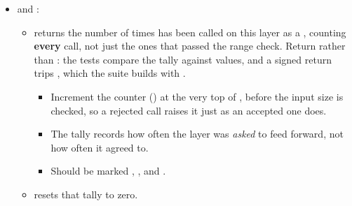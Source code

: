 \begin{itemize}
\begin{itemize}
\begin{itemize}
    \end{itemize}
    \item Returns nothing, and should be marked .
    \item \textbf{Not} part of . It exists on the stub alone.
    \item It's what lets a test drive the output of a whole network in
      Chapter~\ref{c4:ch:network}:
    \begin{itemize}
      \item The network stores its layers by reference, so calling  on the layer
        a network was built with changes what that network predicts.
      \item That reveals whether the network reads its output layer live or kept a stale copy of
        it. Keeping a stale copy is exactly what the note in Chapter~\ref{c4:ch:network} about not
        needing a separate storage variable is there to prevent.
    \end{itemize}
  \end{itemize}
  \item \textbf{} and \textbf{}:
  \begin{itemize}
    \item {} returns the number of times  has been
      called on this layer as a , counting \textbf{every} call, not just the ones
      that passed the range check. Return  rather than : the tests
      compare the tally against  values, and a signed return trips
      , which the suite builds with .
    \begin{itemize}
      \item Increment the counter () at the very top of
        , before the input size is checked, so a rejected call raises it just
        as an accepted one does.
      \item The tally records how often the layer was \emph{asked} to feed forward, not how often
        it agreed to.
      \item Should be marked \code{[[nodiscard]]}, , and .
    \end{itemize}
    \item {} resets that tally to zero.
    \begin{itemize}

\end{itemize}
\end{itemize}
\end{itemize}
